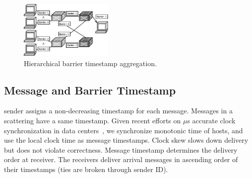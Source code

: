 




\begin{figure}[t]
	\centering
	\includegraphics[width=0.4\textwidth]{images/hierarchical_merge.pdf}
	\caption{Hierarchical barrier timestamp aggregation.} %
	\label{fig:hierarchical_merge}
\end{figure}


\subsection{Message and Barrier Timestamp}
\label{sec:loss-free}

\sys sender assigns a non-decreasing timestamp for each message. Messages in a scattering have a same timestamp.
Given recent efforts on $\mu$s accurate clock synchronization in data centers~\cite{correll2005design,lee2016globally,geng2018exploiting,li2020sundial}, we synchronize monotonic time of hosts, and use the local clock time as message timestamps.
Clock skew slows down delivery but does not violate correctness.
Message timestamp determines the delivery order at receiver.
The receivers deliver arrival messages in ascending order of their timestamps (ties are broken through sender ID).

